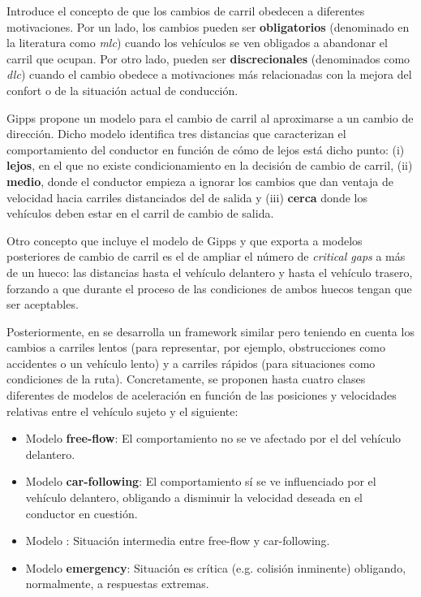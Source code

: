 Introduce el concepto de que los cambios de carril obedecen a diferentes motivaciones. Por un lado, los cambios pueden ser \textbf{obligatorios} (denominado en la literatura como \textit{\Acrfull{mlc}}) cuando los vehículos se ven obligados a abandonar el carril que ocupan. Por otro lado, pueden ser \textbf{discrecionales} (denominados como \textit{\Acrfull{dlc}}) cuando el cambio obedece a motivaciones más relacionadas con la mejora del confort o de la situación actual de conducción.

Gipps propone un modelo para el cambio de carril al aproximarse a un cambio de dirección. Dicho modelo identifica tres distancias que caracterizan el comportamiento del conductor en función de cómo de lejos está dicho punto: (i) \textbf{lejos}, en el que no existe condicionamiento en la decisión de cambio de carril, (ii) \textbf{medio}, donde el conductor empieza a ignorar los cambios que dan ventaja de velocidad hacia carriles distanciados del de salida y (iii) \textbf{cerca} donde los vehículos deben estar en el carril de cambio de salida.

Otro concepto que incluye el modelo de Gipps y que exporta a modelos posteriores de cambio de carril es el de ampliar el número de \textit{critical gaps} a más de un hueco: las distancias hasta el vehículo delantero y hasta el vehículo trasero, forzando a que durante el proceso de \textit{} las condiciones de ambos huecos tengan que ser aceptables.

Posteriormente, en \cite{wiedemann1992microscopic} se desarrolla un framework similar pero teniendo en cuenta los cambios a carriles lentos (para representar, por ejemplo, obstrucciones como accidentes o un vehículo lento) y a carriles rápidos (para situaciones como condiciones de la ruta). Concretamente, se proponen hasta cuatro clases diferentes de modelos de aceleración en función de las posiciones y velocidades relativas entre el vehículo sujeto y el siguiente:

\begin{itemize}
	\item Modelo \textbf{\gls{free-flow}}: El comportamiento no se ve afectado por el del vehículo delantero.
	\item Modelo \textbf{\gls{car-following}}: El comportamiento sí se ve influenciado por el vehículo delantero, obligando a disminuir la velocidad deseada en el conductor en cuestión.
	\item Modelo \textbf{}: Situación intermedia entre \gls{free-flow} y \gls{car-following}.
	\item Modelo \textbf{emergency}: Situación es crítica (e.g. colisión inminente) obligando, normalmente, a respuestas extremas.
\end{itemize}
	
